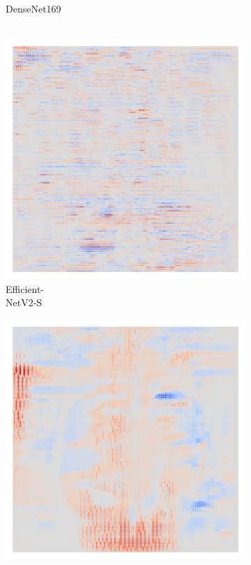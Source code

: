 \begin{figure}[H]
\begin{subfigure}{0.16\linewidth}
        \caption{DenseNet169\\\textcolor{white}{Latias}}
    \end{subfigure}\hfill%
    \begin{subfigure}{0.16\linewidth}
        \centering
        \includegraphics[height=1\linewidth]{01-images/05-resultate/uap_efficientnet_s/uap0-efficientnet_v2_s-covidx_data-n200-robustificationslevel0.png}
        \caption{Efficient-\\NetV2-S}
    \end{subfigure}\hfill%
    \begin{subfigure}{0.16\linewidth}
        \centering
        \includegraphics[height=1\linewidth]{01-images/05-resultate/uap_efficientnet_m/uap0-efficientnet_v2_m-covidx_data-n200-robustificationslevel0.png}

\end{subfigure}
\end{figure}

